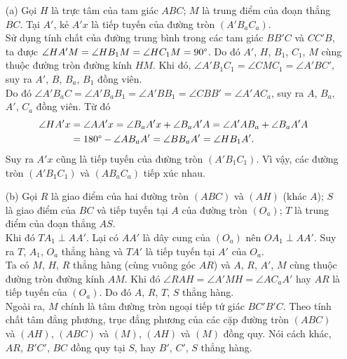         \begin{solution}
            \hfill
            \begin{enumerate}
                \item[(a)] Gọi \(H\) là trực tâm của tam giác \(ABC\); \(M\) là trung điểm của đoạn thẳng \(BC\). Tại \(A'\), kẻ \(A'x\) là tiếp tuyến của đường tròn \((A'B_aC_a)\).\\
                Sử dụng tính chất của đường trung bình trong các tam giác \(BB'C\) và \(CC'B\), ta được \(\angle HA'M = \angle HB_1M = \angle HC_1M = 90 \degree\). Do đó \(A'\), \(H\), \(B_1\), \(C_1\), \(M\) cùng thuộc đường tròn đường kính \(HM\). Khi đó, \(\angle A'B_1C_1 = \angle CMC_1 = \angle A'BC'\), suy ra \(A'\), \(B\), \(B_a\), \(B_1\) đồng viên.\\
                Do đó \(\angle A'B_aC = \angle A'B_aB_1 = \angle A'BB_1 = \angle CBB' = \angle A'AC_a\), suy ra \(A\), \(B_a\), \(A'\), \(C_a\) đồng viên. Từ đó
                \begin{equation}
                    \begin{aligned}
                        \angle HA'x &= \angle AA'x = \angle B_aA'x + \angle B_aA'A = \angle A'AB_a + \angle B_aA'A \\
                        &= 180 \degree - \angle AB_aA' = \angle BB_aA' = \angle HB_1A'.
                    \end{aligned}
                    \notag
                \end{equation}
                Suy ra \(A'x\) cũng là tiếp tuyến của đường tròn \((A'B_1C_1)\). Vì vậy, các đường tròn \((A'B_1C_1)\) và \((AB_aC_a)\) tiếp xúc nhau.
                \item[(b)] Gọi \(R\) là giao điểm của hai đường tròn \((ABC)\) và \((AH)\) (khác \(A\)); \(S\) là giao điểm của \(BC\) và tiếp tuyến tại \(A\) của đường tròn \((O_a)\); \(T\) là trung điểm của đoạn thẳng \(AS\).\\
                Khi đó \(TA_1 \perp AA'\). Lại có \(AA'\) là dây cung của \((O_a)\) nên \(OA_1 \perp AA'\). Suy ra \(T\), \(A_1\), \(O_a\) thẳng hàng và \(TA'\) là tiếp tuyến tại \(A'\) của \(O_a\).\\
                Ta có \(M\), \(H\), \(R\) thẳng hàng (cùng vuông góc \(AR\)) và \(A\), \(R\), \(A'\), \(M\) cùng thuộc đường tròn đường kính \(AM\). Khi đó \(\angle RAH = \angle A'MH = \angle AC_aA'\) hay \(AR\) là tiếp tuyến của \((O_a)\). Do đó \(A\), \(R\), \(T\), \(S\) thẳng hàng.\\
                Ngoài ra, \(M\) chính là tâm đường tròn ngoại tiếp tứ giác \(BC'B'C\). Theo tính chất tâm đẳng phương, trục đẳng phương của các cặp đường tròn \((ABC)\) và \((AH)\), \((ABC)\) và \((M)\), \((AH)\) và \((M)\) đồng quy. Nói cách khác, \(AR\), \(B'C'\), \(BC\) đồng quy tại \(S\), hay \(B'\), \(C'\), \(S\) thẳng hàng.\\

\end{enumerate}
\end{solution}
